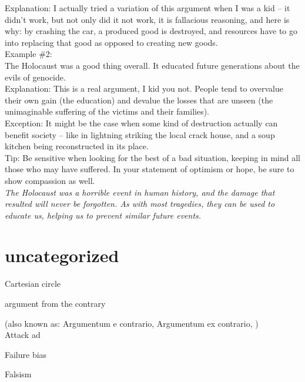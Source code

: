 \documentclass[a4paper,12pt,single,pdftex]{scrartcl}
\begin{document}
    
      Explanation: I actually tried a variation of this argument when I was a kid -- it didn’t work, but not only did it not work, it is fallacious reasoning, and here is why: by crashing the car, a produced good is destroyed, and resources have to go into replacing that good as opposed to creating new goods.
    \\

    
      Example \#2:
    \\

    
      The Holocaust was a good thing overall.  It educated future generations about the evils of genocide.
    \\

    
      Explanation: This is a real argument, I kid you not.  People tend to overvalue their own gain (the education) and devalue the losses that are unseen (the unimaginable suffering of the victims and their families). 
    \\

    
      Exception: It might be the case when some kind of destruction actually can benefit society -- like in lightning striking the local crack house, and a soup kitchen being reconstructed in its place.
    \\

    
      Tip: Be sensitive when looking for the best of a bad situation, keeping in mind all those who may have suffered. In your statement of optimism or hope, be sure to show compassion as well.
    \\

    
      {\em The Holocaust was a horrible event in human history, and the damage that resulted will never be forgotten. As with most tragedies, they can be used to educate us, helping us to prevent similar future events.}
    \\

  \section{uncategorized
  }


Cartesian circle

argument from the contrary
    
      (also known as: Argumentum e contrario, Argumentum ex contrario, )
    \\

  

Attack ad

Failure bias

Falsism
\end{document}

